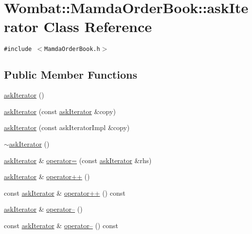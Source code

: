 \hypertarget{classWombat_1_1MamdaOrderBook_1_1askIterator}{
\section{Wombat::Mamda\-Order\-Book::ask\-Iterator Class Reference}
\label{classWombat_1_1MamdaOrderBook_1_1askIterator}
}
{\tt \#include $<$Mamda\-Order\-Book.h$>$}

\subsection*{Public Member Functions}
\begin{CompactItemize}
\item 
\hyperlink{classWombat_1_1MamdaOrderBook_1_1askIterator_7d34a020403c3fb154f0ce19d1a5c4f7}{ask\-Iterator} ()
\item 
\hyperlink{classWombat_1_1MamdaOrderBook_1_1askIterator_43add14c1cfd9f403be50ef83c01595c}{ask\-Iterator} (const \hyperlink{classWombat_1_1MamdaOrderBook_1_1askIterator}{ask\-Iterator} \&copy)
\item 
\hyperlink{classWombat_1_1MamdaOrderBook_1_1askIterator_859baa6767235f2eb9b5ab07476328b9}{ask\-Iterator} (const ask\-Iterator\-Impl \&copy)
\item 
\hyperlink{classWombat_1_1MamdaOrderBook_1_1askIterator_a1d47af3cde6e587811da9246dc41785}{$\sim$ask\-Iterator} ()
\item 
\hyperlink{classWombat_1_1MamdaOrderBook_1_1askIterator}{ask\-Iterator} \& \hyperlink{classWombat_1_1MamdaOrderBook_1_1askIterator_4cc5e66440e8009e1e7eb50bc2d9d539}{operator=} (const \hyperlink{classWombat_1_1MamdaOrderBook_1_1askIterator}{ask\-Iterator} \&rhs)
\item 
\hyperlink{classWombat_1_1MamdaOrderBook_1_1askIterator}{ask\-Iterator} \& \hyperlink{classWombat_1_1MamdaOrderBook_1_1askIterator_75e112d63ea19653bf89d4013fa8682d}{operator++} ()
\item 
const \hyperlink{classWombat_1_1MamdaOrderBook_1_1askIterator}{ask\-Iterator} \& \hyperlink{classWombat_1_1MamdaOrderBook_1_1askIterator_66e4059fe31cf7c2b74dc184caeed580}{operator++} () const 
\item 
\hyperlink{classWombat_1_1MamdaOrderBook_1_1askIterator}{ask\-Iterator} \& \hyperlink{classWombat_1_1MamdaOrderBook_1_1askIterator_e51f1bb1e54a8a52e46c477837191e28}{operator--} ()
\item 
const \hyperlink{classWombat_1_1MamdaOrderBook_1_1askIterator}{ask\-Iterator} \& \hyperlink{classWombat_1_1MamdaOrderBook_1_1askIterator_994e57b3097dcbbdc887005135303cc2}{operator--} () const 

\end{CompactItemize}
